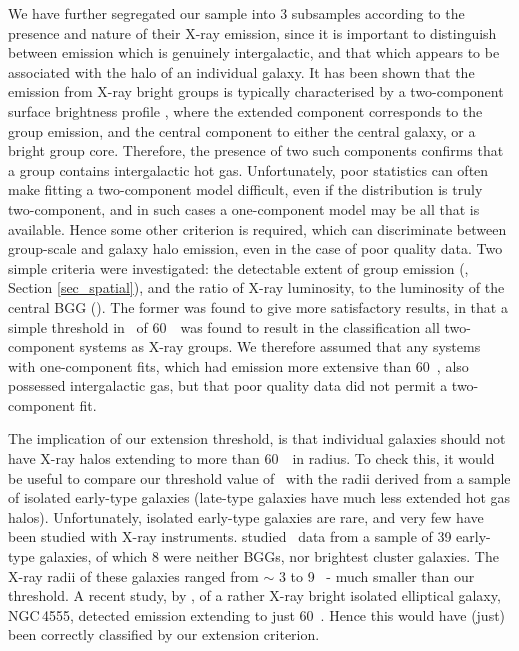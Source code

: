 \documentclass[usenatbib]{mn2e}
\begin{document}
We have further segregated our sample into 3 subsamples according to the presence
and nature of their X-ray emission, since it is important to distinguish between
emission which is genuinely intergalactic, and that which appears to be
associated with the halo of an individual galaxy.  It has been shown that the
emission from X-ray bright groups is typically characterised by a two-component
surface brightness profile \citep{mulchaey98}, where the extended component
corresponds to the group emission, and the central component to either the
central galaxy, or a bright group core.  Therefore, the presence of two such
components confirms that a group contains intergalactic hot gas.  Unfortunately,
poor statistics can often make fitting a two-component model difficult, even if
the distribution is truly two-component, and in such cases a one-component model
may be all that is available. Hence some other criterion is required, which can
discriminate between group-scale and galaxy halo emission, even in the case of
poor quality data.  Two simple criteria were investigated: the detectable extent
of group emission (\rext, Section \ref{sec_spatial}), and the ratio of X-ray
luminosity, to the luminosity of the central BGG (\LXpLBGG). The former was found
to give more satisfactory results, in that a simple threshold in \rext\ of
60~\kpc\ was found to result in the classification all two-component systems as
X-ray groups.  We therefore assumed that any systems with one-component fits,
which had emission more extensive than 60~\kpc, also possessed intergalactic gas,
but that poor quality data did not permit a two-component fit.

The implication of our extension threshold, is that individual galaxies should
not have X-ray halos extending to more than 60~\kpc\ in radius. To check this, it
would be useful to compare our threshold value of \rext\ with the radii derived
from a sample of isolated early-type galaxies (late-type galaxies have much less
extended hot gas halos).  Unfortunately, isolated early-type galaxies are rare,
and very few have been studied with X-ray instruments.  \citet{osullivan03}
studied \ROSAT\ data from a sample of 39 early-type galaxies, of which 8 were
neither BGGs, nor brightest cluster galaxies.  The X-ray radii of these galaxies
ranged from $\sim$ 3 to 9 \kpc\ - much smaller than our threshold.  A recent
study, by \citet{osullivan04}, of a rather X-ray bright isolated elliptical
galaxy, NGC\,4555, detected emission extending to just 60~\kpc.  Hence this would
have (just) been correctly classified by our extension criterion.
\end{document}
